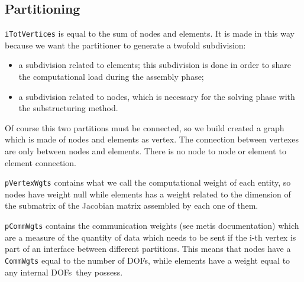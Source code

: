\documentclass[10pt,fleqn,subeqn]{report}
\newcommand{\dofs}{DOFs}
\begin{document}
\subsection{Partitioning}
\texttt{iTotVertices} is equal to the sum of nodes and elements. 
It is made in this way because we want the partitioner 
to generate a twofold subdivision:
\begin{itemize}
\item a subdivision related to elements; 
this subdivision is done in order to share the computational 
load during the assembly phase;
\item a subdivision related to nodes, 
which is necessary for the solving phase with the substructuring method.
\end{itemize}
Of course this two partitions must be connected, 
so we build created a graph which is made of nodes and elements as vertex. 
The connection between vertexes are only between nodes and elements. 
There is no node to node or element to element connection.

\texttt{pVertexWgts} 
contains what we call the computational weight of each entity, 
so nodes have weight null while elements has a weight related to 
the dimension of the submatrix of the Jacobian matrix assembled
by each one of them.

\texttt{pCommWgts} contains the communication weights 
(see metis documentation) which are a measure of the quantity 
of data which needs to be sent if the i-th vertex is part 
of an interface between different partitions. 
This means that nodes have a \texttt{CommWgts} equal to the number 
of \dofs, while elements have a weight equal
to any internal \dofs\ they possess.
\end{document}
